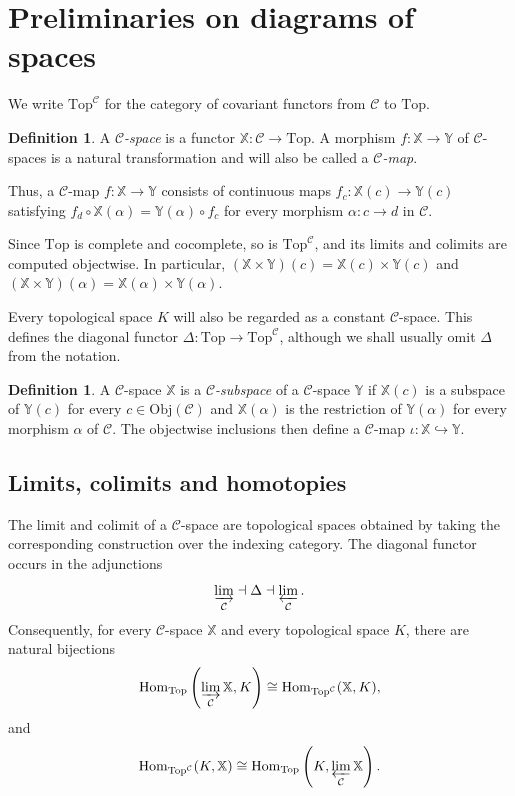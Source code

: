 \documentclass[12pt]{amsart}
\theoremstyle{definition}
\newtheorem{defi}[teo]{Definition}
\theoremstyle{remark}
\numberwithin{figure}{section}%
\newcommand{\CC}{\mathcal{C}}
\newcommand{\Top}{\mathrm{Top}}
\newcommand{\X}{\mathbb{X}}
\newcommand{\Y}{\mathbb{Y}}
\newcommand{\Hom}{\mathrm{Hom}}
\newcommand{\Obj}{\mathrm{Obj}}
\begin{document}
\section{Preliminaries on diagrams of spaces}
\label{sec:homotopy-diagrams}
\label{sec:mapping-spaces}

We write $\Top^{\CC}$ for the
category of covariant functors from $\CC$ to $\Top$.

\begin{defi}
A \emph{$\CC$-space} is a functor $\X\colon\CC\to\Top$. A morphism
$f\colon\X\to\Y$ of $\CC$-spaces is a natural transformation and will
also be called a \emph{$\CC$-map}.
\end{defi}

Thus, a $\CC$-map $f\colon\X\to\Y$ consists of continuous maps
$f_c\colon\X(c)\to\Y(c)$ satisfying
$f_d\circ\X(\alpha)=\Y(\alpha)\circ f_c$ for every morphism
$\alpha\colon c\to d$ in $\CC$.

Since $\Top$ is complete and cocomplete, so is $\Top^{\CC}$, and its
limits and colimits are computed objectwise. In particular,
$(\X\times\Y)(c)=\X(c)\times\Y(c)$ and
$(\X\times\Y)(\alpha)=\X(\alpha)\times\Y(\alpha)$.

Every topological space $K$ will also be regarded as a constant
$\CC$-space. This defines the diagonal functor
$\Delta\colon\Top\to\Top^{\CC}$, although we shall usually omit
$\Delta$ from the notation.

\begin{defi}
A $\CC$-space $\X$ is a \emph{$\CC$-subspace} of a $\CC$-space $\Y$
if $\X(c)$ is a subspace of $\Y(c)$ for every $c\in\Obj(\CC)$ and
$\X(\alpha)$ is the restriction of $\Y(\alpha)$ for every morphism
$\alpha$ of $\CC$. The objectwise inclusions then define a $\CC$-map
$\iota\colon\X\hookrightarrow\Y$.
\end{defi}

\subsection{Limits, colimits and homotopies}

The limit and colimit of a $\CC$-space are topological spaces obtained
by taking the corresponding construction over the indexing category.
The diagonal functor occurs in the adjunctions
\[
\varinjlim_{\CC}\dashv\Delta\dashv\varprojlim_{\CC}.
\]
Consequently, for every $\CC$-space $\X$ and every topological space
$K$, there are natural bijections
\[
\Hom_{\Top}\left(\varinjlim_{\CC}\X,K\right)
\cong
\Hom_{\Top^{\CC}}(\X,K),
\]
and
\[
\Hom_{\Top^{\CC}}(K,\X)
\cong
\Hom_{\Top}\left(K,\varprojlim_{\CC}\X\right).
\]
\end{document}
